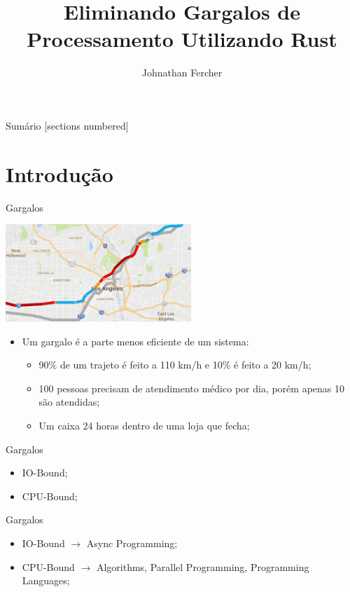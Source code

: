 \documentclass[aspectratio=169]{beamer}
\title{Eliminando Gargalos de Processamento \newline Utilizando Rust}
\date{}
\author{Johnathan Fercher}
\begin{document}
\maketitle

\begin{frame}{Sumário}
  [sections numbered]
  \tableofcontents[hideallsubsections]
\end{frame}

\section{Introdução}
\begin{frame}{Gargalos}	
	\begin{center}
		\includegraphics[width=7cm]{imgs/bottleneck}
	\end{center}
	\begin{itemize}
		\item Um gargalo é a parte menos eficiente de um sistema:
		\begin{itemize}
			\item 90\% de um trajeto é feito a 110 km/h e 10\% é feito a 20 km/h;
			\item 100 pessoas precisam de atendimento médico por dia, porém apenas 10 são atendidas;
			\item Um caixa 24 horas dentro de uma loja que fecha;
		\end{itemize}
	\end{itemize}		
\end{frame}

\begin{frame}{Gargalos}	
	\begin{itemize}
		\item IO-Bound;
		\item CPU-Bound;
	\end{itemize}	
\end{frame}

\begin{frame}{Gargalos}		
	\begin{itemize}
		\item IO-Bound $\rightarrow$ Async Programming;
		\item CPU-Bound $\rightarrow$ Algorithms, Parallel Programming, Programming Languages;
	\end{itemize}	
\end{frame}
\end{document}
